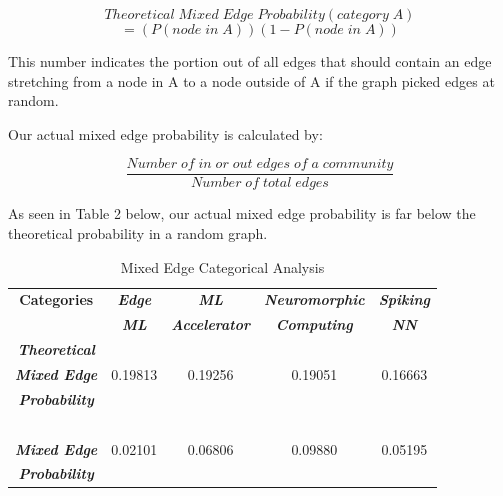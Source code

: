 \documentclass[conference]{IEEEtran}
\begin{document}
\begin{equation}
    Theoretical\; Mixed\; Edge\; Probability(category\; A)
\end{equation}
\begin{equation}
    = (P(node\; in\;A)) (1 - P(node\;in\;A))\label{eq1}
\end{equation}

This number indicates the portion out of all edges that should contain an edge stretching 
from a node in A to a node outside of A if the graph picked edges at random. \par

Our actual mixed edge probability is calculated by: \par
\begin{equation}
    \dfrac{Number\; of\; in\; or\; out\; edges\; of\; a\; community}{Number\; of\; total\; edges}
    \label{eq2}
\end{equation}

As seen in Table 2 below, our actual mixed edge probability is far 
below the theoretical probability in a random graph. \par

\begin{table}[htbp]
    \caption{Mixed Edge Categorical Analysis}
    \begin{center}
        \begin{tabular}{|c|cccc|}
        \hline
        \textbf{Categories} & \textbf{\textit{Edge}} & \textbf{\textit{ML}} & 
        \textbf{\textit{Neuromorphic}} & \textbf{\textit{Spiking}} \\
        \textbf{} & \textbf{\textit{ML}} & \textbf{\textit{Accelerator}} & 
        \textbf{\textit{Computing}} & \textbf{\textit{NN}} \\
        \hline
        \textbf{\textit{Theoretical}} &\ &\ &\ &\ \\
        \textbf{\textit{Mixed Edge}} &
        0.19813& 0.19256& 0.19051& 0.16663 \\
        \textbf{\textit{Probability}} & \ &\ &\ &\ \\
        \ & \ &\ &\ &\ \\
        \textbf{\textit{Mixed Edge}} & 
        0.02101& 0.06806& 0.09880& 0.05195 \\
        \textbf{\textit{Probability}} & \ &\ &\ &\ \\
        \hline
        \end{tabular}
        \label{tab2}
    \end{center}
\end{table}
\end{document}
